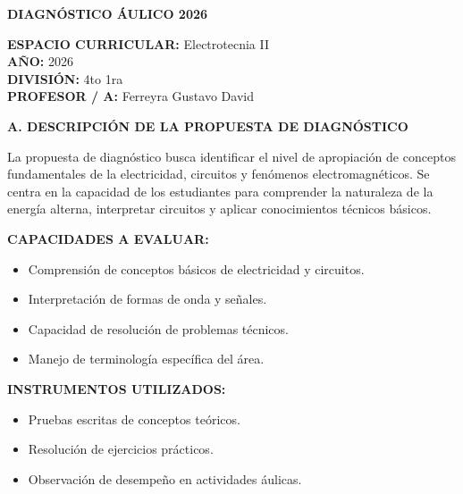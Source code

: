 \documentclass[a4paper,12pt]{article}
\begin{document}
\begin{center}
  \fontsize{14pt}{16pt}\selectfont \textbf{\uppercase{Diagnóstico Áulico 2026}}
\end{center}

\vspace{0.3cm}

\raggedright
\textbf{ESPACIO CURRICULAR:} Electrotecnia II \\
\textbf{AÑO:} 2026 \\
\textbf{DIVISIÓN:} 4to 1ra \\
\textbf{PROFESOR / A:} Ferreyra Gustavo David

\vspace{0.5cm}

\begin{center}\fontsize{12pt}{14pt}\selectfont \textbf{\uppercase{A. DESCRIPCIÓN DE LA PROPUESTA DE DIAGNÓSTICO}}\end{center}

\fontsize{12pt}{14pt}\selectfont
La propuesta de diagnóstico busca identificar el nivel de apropiación de conceptos fundamentales de la electricidad, circuitos y fenómenos electromagnéticos. Se centra en la capacidad de los estudiantes para comprender la naturaleza de la energía alterna, interpretar circuitos y aplicar conocimientos técnicos básicos.

\vspace{0.3cm}
\textbf{CAPACIDADES A EVALUAR:}
\begin{itemize}[leftmargin=*, nosep]
  \item Comprensión de conceptos básicos de electricidad y circuitos.
  \item Interpretación de formas de onda y señales.
  \item Capacidad de resolución de problemas técnicos.
  \item Manejo de terminología específica del área.
\end{itemize}

\vspace{0.3cm}
\textbf{INSTRUMENTOS UTILIZADOS:}
\begin{itemize}[leftmargin=*, nosep]
  \item Pruebas escritas de conceptos teóricos.
  \item Resolución de ejercicios prácticos.
  \item Observación de desempeño en actividades áulicas.
\end{itemize}
\end{document}
